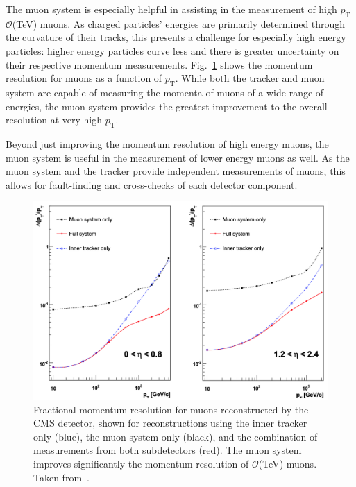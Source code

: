 The muon system is especially helpful in assisting in the measurement of high $p_{\text{T}}$ $\mathcal O$(TeV) muons.
As charged particles' energies are primarily determined through the curvature of their tracks, this presents a challenge for especially high energy particles: higher energy particles curve less and there is greater uncertainty on their respective momentum measurements.
Fig.~\ref{fig:cms_muon_vs_tracker} shows the momentum resolution for muons as a function of $p_{\text{T}}$.
While both the tracker and muon system are capable of measuring the momenta of muons of a wide range of energies, the muon system provides the greatest improvement to the overall resolution at very high $p_{\text{T}}$.

Beyond just improving the momentum resolution of high energy muons, the muon system is useful in the measurement of lower energy muons as well.
As the muon system and the tracker provide independent measurements of muons, this allows for fault-finding and cross-checks of each detector component.

\begin{figure} [htbp!]
    \centering
    \includegraphics[width=0.8\linewidth]{figures/cms/cms_tracker_vs_muon.png}
    \caption{Fractional momentum resolution for muons reconstructed by the CMS detector, shown for reconstructions using the inner tracker only (blue), the muon system only (black), and the combination of measurements from both subdetectors (red). The muon system improves significantly the momentum resolution of $\mathcal O$(TeV) muons. Taken from~\cite{Chatrchyan:2008aa}.}
    \label{fig:cms_muon_vs_tracker}
\end{figure}

